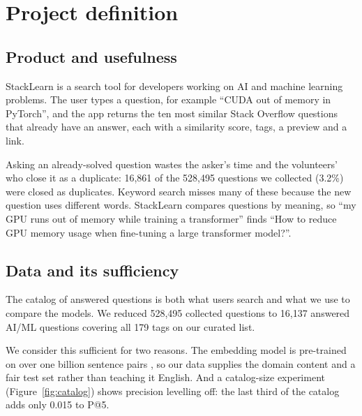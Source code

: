 \section{Project definition}

\subsection{Product and usefulness}

StackLearn is a search tool for developers working on AI and machine learning problems. The user types a
question, for example ``CUDA out of memory in PyTorch'', and the app returns the ten most similar Stack
Overflow questions that already have an answer, each with a similarity score, tags, a preview and a link.

Asking an already-solved question wastes the asker's time and the volunteers' who close it as a
duplicate: 16,861 of the 528,495 questions we collected (3.2\%) were
closed as duplicates. Keyword search misses many of these because the new question uses different words.
StackLearn compares questions by meaning, so ``my GPU runs out of memory while training a transformer''
finds ``How to reduce GPU memory usage when fine-tuning a large transformer model?''.

\subsection{Data and its sufficiency}

The catalog of answered questions is both what users search and what we use to compare the models. We
reduced 528,495 collected questions to 16,137 answered AI/ML questions
covering all 179 tags on our curated list.

We consider this sufficient for two reasons. The embedding model is pre-trained on over one billion
sentence pairs \cite{reimers2019sbert}, so our data supplies the domain content and a fair test set
rather than teaching it English. And a catalog-size experiment (Figure~\ref{fig:catalog}) shows precision
levelling off: the last third of the catalog adds only 0.015 to P@5.
